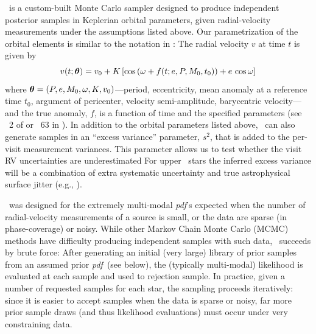 \documentclass[modern, letterpaper]{aastex62}
\newcommand{\thejoker}{\project{The~Joker}}
\newcommand{\RGB}{\acronym{RGB}}
\newcommand{\pdf}{\textit{pdf}}
\begin{document}
\thejoker\ is a custom-built Monte Carlo sampler designed to produce independent
posterior samples in Keplerian orbital parameters, given radial-velocity
measurements under the assumptions listed above.
Our parametrization of the orbital elements is similar to the notation in
\citet{Murray:2010}:
The radial velocity $v$ at time $t$ is given by
\begin{equation}
  v(t;\bs{\theta}) = v_0 + K\,[\cos\left(\omega + f(t; e, P, M_0, t_0)\right) +
    e\,\cos\omega]
\end{equation}
where $\boldsymbol{\theta} = (P,e,M_0,\omega,K,v_0)$---period, eccentricity, mean
anomaly at a reference time $t_0$, argument of pericenter, velocity
semi-amplitude, barycentric velocity---and the true anomaly, $f$, is a function
of time and the specified parameters (see \sectionname~2 of
\citealt{Price-Whelan:2017} or \eqname~63 in \citealt{Murray:2010}).
In addition to the orbital parameters listed above, \thejoker\ can also generate
samples in an ``excess variance'' parameter, $s^2$, that is added to the
per-visit measurement variances.
This parameter allows us to test whether the visit RV uncertainties are
underestimated
For upper \RGB\ stars the inferred excess variance will be a combination of
extra systematic uncertainty and true astrophysical surface jitter
(e.g., \cite{Hekker:2008}).

\thejoker\ was designed for the extremely multi-modal \pdf 's expected when the
number of radial-velocity measurements of a source is small, or the data are
sparse (in phase-coverage) or noisy.
While other Markov Chain Monte Carlo (MCMC) methods have difficulty producing
independent samples with such data, \thejoker\ succeeds by brute force:
After generating an initial (very large) library of prior samples from an
assumed prior \pdf\ (see below), the (typically multi-modal) likelihood is
evaluated at each sample and used to rejection sample.
In practice, given a number of requested samples for each star, the sampling
proceeds iteratively: since it is easier to accept samples when the data is
sparse or noisy, far more prior sample draws (and thus likelihood evaluations)
must occur under very constraining data.

%
%
%
\end{document}
